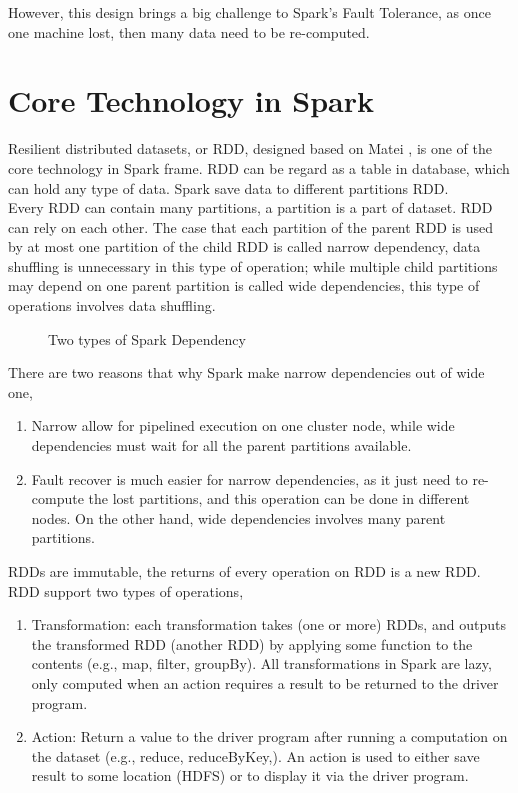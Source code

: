 However, this design brings a big challenge to Spark’s Fault Tolerance, as once one machine lost, then many data need to be re-computed.

\section{Core Technology in Spark\cite{ryza2015advanced}}
Resilient distributed datasets, or RDD, designed based on Matei \cite{zaharia2012resilient}, is one of the core technology in Spark frame. RDD can be regard as a table in database, which can hold any type of data. Spark save data to different partitions RDD.\\


Every RDD can contain many partitions, a partition is a part of dataset. RDD can rely on each other. The case that each partition of the parent RDD is used by at most one partition of the child RDD is called narrow dependency, data shuffling is unnecessary in this type of operation; while multiple child partitions may depend on one parent partition is called wide dependencies, this type of operations involves data shuffling.
\begin{figure}[h]
	\centering
	\caption{Two types of Spark Dependency\cite{zaharia2016architecture}}
\end{figure} 
\clearpage

There are two reasons that why Spark make narrow dependencies out of wide one\cite{zaharia2016architecture},
\begin{enumerate}
	\item Narrow allow for pipelined execution on one cluster node, while wide dependencies must wait for all the parent partitions available.
	\item Fault recover is much easier for narrow dependencies, as it just need to re-compute the lost partitions, and this operation can be done in different nodes. On the other hand, wide dependencies involves many parent partitions.
\end{enumerate}

RDDs are immutable, the returns of every operation on RDD is a new RDD. RDD support two types of operations,

\begin{enumerate}
	\item Transformation: each transformation takes (one or more) RDDs, and outputs the transformed RDD (another RDD) by applying some function to the contents (e.g., map, filter, groupBy). All transformations in Spark are lazy, only computed when an action requires a result to be returned to the driver program.
	\item Action: Return a value to the driver program after running a computation on the dataset (e.g., reduce, reduceByKey,). An action is used to either save result to some location (HDFS) or to display it via the driver program.
\end{enumerate}

